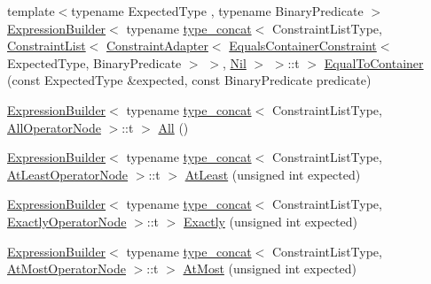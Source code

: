 \begin{DoxyCompactItemize}
\item 
{\footnotesize template$<$typename Expected\+Type , typename Binary\+Predicate $>$ }\\\mbox{\hyperlink{structsnowhouse_1_1ExpressionBuilder}{Expression\+Builder}}$<$ typename \mbox{\hyperlink{structsnowhouse_1_1type__concat}{type\+\_\+concat}}$<$ Constraint\+List\+Type, \mbox{\hyperlink{structsnowhouse_1_1ConstraintList}{Constraint\+List}}$<$ \mbox{\hyperlink{structsnowhouse_1_1ConstraintAdapter}{Constraint\+Adapter}}$<$ \mbox{\hyperlink{structsnowhouse_1_1EqualsContainerConstraint}{Equals\+Container\+Constraint}}$<$ Expected\+Type, Binary\+Predicate $>$ $>$, \mbox{\hyperlink{structsnowhouse_1_1Nil}{Nil}} $>$ $>$\+::t $>$ \mbox{\hyperlink{structsnowhouse_1_1ExpressionBuilder_afbae8b5309b0d83ddc90c6393dae427e}{Equal\+To\+Container}} (const Expected\+Type \&expected, const Binary\+Predicate predicate)
\item 
\mbox{\hyperlink{structsnowhouse_1_1ExpressionBuilder}{Expression\+Builder}}$<$ typename \mbox{\hyperlink{structsnowhouse_1_1type__concat}{type\+\_\+concat}}$<$ Constraint\+List\+Type, \mbox{\hyperlink{structsnowhouse_1_1ExpressionBuilder_a25ac097d527e6c4fabd98aa1334a42c6}{All\+Operator\+Node}} $>$\+::t $>$ \mbox{\hyperlink{structsnowhouse_1_1ExpressionBuilder_a553914f0120a29b8e5edc98d83490e46}{All}} ()
\item 
\mbox{\hyperlink{structsnowhouse_1_1ExpressionBuilder}{Expression\+Builder}}$<$ typename \mbox{\hyperlink{structsnowhouse_1_1type__concat}{type\+\_\+concat}}$<$ Constraint\+List\+Type, \mbox{\hyperlink{structsnowhouse_1_1ExpressionBuilder_aaf839b9ebd0daa72220cc48bfaaea83f}{At\+Least\+Operator\+Node}} $>$\+::t $>$ \mbox{\hyperlink{structsnowhouse_1_1ExpressionBuilder_a3da53251d52f2e5052634132b687ab2f}{At\+Least}} (unsigned int expected)
\item 
\mbox{\hyperlink{structsnowhouse_1_1ExpressionBuilder}{Expression\+Builder}}$<$ typename \mbox{\hyperlink{structsnowhouse_1_1type__concat}{type\+\_\+concat}}$<$ Constraint\+List\+Type, \mbox{\hyperlink{structsnowhouse_1_1ExpressionBuilder_af776b29f6fb154ca3179a31fdbcc92c5}{Exactly\+Operator\+Node}} $>$\+::t $>$ \mbox{\hyperlink{structsnowhouse_1_1ExpressionBuilder_aeacedc8fc8c1302853fc4a4f842b87c7}{Exactly}} (unsigned int expected)
\item 
\mbox{\hyperlink{structsnowhouse_1_1ExpressionBuilder}{Expression\+Builder}}$<$ typename \mbox{\hyperlink{structsnowhouse_1_1type__concat}{type\+\_\+concat}}$<$ Constraint\+List\+Type, \mbox{\hyperlink{structsnowhouse_1_1ExpressionBuilder_a41e14d33809a425326ef459325569442}{At\+Most\+Operator\+Node}} $>$\+::t $>$ \mbox{\hyperlink{structsnowhouse_1_1ExpressionBuilder_acfe72af93abda43eb143ef07475357ff}{At\+Most}} (unsigned int expected)

\end{DoxyCompactItemize}
